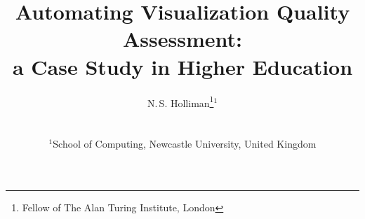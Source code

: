 


\title[Automating Visualization Quality Assessment]%
      {Automating Visualization Quality Assessment: \\ a Case Study in Higher Education}

\author[N.S. Holliman]
{\parbox{\textwidth}{\centering N.\,S. Holliman\thanks{Fellow of The Alan Turing Institute, London}$^{1}$ } \\
{\parbox{\textwidth}{\centering $^1$School of Computing, Newcastle University, United Kingdom} } }

%






